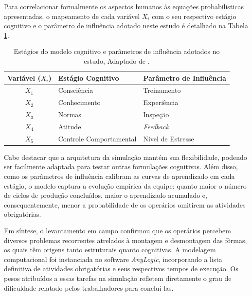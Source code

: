 
Para correlacionar formalmente os aspectos humanos às equações probabilísticas apresentadas, o mapeamento de cada variável $X_i$ com o seu respectivo estágio cognitivo e o parâmetro de influência adotado neste estudo é detalhado na Tabela \ref{tab:fatores_influencia}.

\begin{table}[htpb]
	\centering
	\caption{Estágios do modelo cognitivo e parâmetros de influência adotados no estudo, Adaptado de .}
	\label{tab:fatores_influencia}
	\begin{tabular}{cll}
		\hline
		\textbf{Variável ($X_i$)} & \textbf{Estágio Cognitivo} & \textbf{Parâmetro de Influência} \\ \hline
		$X_1$ & Consciência & Treinamento \\
		$X_2$ & Conhecimento & Experiência \\
		$X_3$ & Normas & Inspeção \\
		$X_4$ & Atitude & \textit{Feedback} \\
		$X_5$ & Controle Comportamental & Nível de Estresse \\ \hline
	\end{tabular}
\end{table}

Cabe destacar que a arquitetura da simulação mantém sua flexibilidade, podendo ser facilmente adaptada para testar outras formulações cognitivas. Além disso, como os parâmetros de influência calibram as curvas de aprendizado em cada estágio, o modelo captura a evolução empírica da equipe: quanto maior o número de ciclos de produção concluídos, maior o aprendizado acumulado e, consequentemente, menor a probabilidade de os operários omitirem as atividades obrigatórias.

Em síntese, o levantamento em campo confirmou que os operários percebem diversos problemas recorrentes atrelados à montagem e desmontagem das fôrmas, os quais têm origens tanto estruturais quanto cognitivas. A modelagem computacional foi instanciada no software \textit{AnyLogic}, incorporando a lista definitiva de atividades obrigatórias e seus respectivos tempos de execução. Os pesos atribuídos a essas tarefas na simulação refletem diretamente o grau de dificuldade relatado pelos trabalhadores para concluí-las. 


